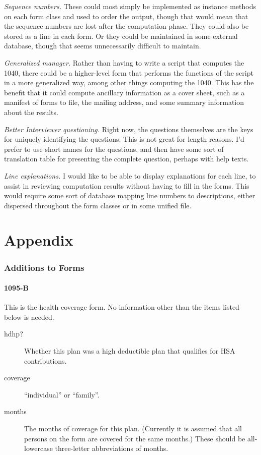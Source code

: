 \documentclass[12pt]{article}
\begin{document}
\emph{Sequence numbers.} These could most simply be implemented as instance
methods on each form class and used to order the output, though that would mean
that the sequence numbers are lost after the computation phase. They could also
be stored as a line in each form. Or they could be maintained in some external
database, though that seems unnecessarily difficult to maintain.

\emph{Generalized manager.} Rather than having to write a script that computes
the 1040, there could be a higher-level form that performs the functions of the
script in a more generalized way, among other things computing the 1040. This
has the benefit that it could compute ancillary information as a cover sheet,
such as a manifest of forms to file, the mailing address, and some summary
information about the results.

\emph{Better Interviewer questioning.} Right now, the questions themselves are
the keys for uniquely identifying the questions. This is not great for length
reasons. I'd prefer to use short names for the questions, and then have some
sort of translation table for presenting the complete question, perhaps with
help texts.

\emph{Line explanations.} I would like to be able to display explanations for
each line, to assist in reviewing computation results without having to fill in
the forms. This would require some sort of database mapping line numbers to
descriptions, either dispersed throughout the form classes or in some unified
file.




\appendix

\part*{Appendix}


\section{Additions to Forms}

\subsection{1095-B}

This is the health coverage form. No information other than the items listed
below is needed.

\begin{description}
\item[hdhp?] Whether this plan was a high deductible plan that qualifies for HSA
contributions.
\item[coverage] ``individual'' or ``family''.
\item[months] The months of coverage for this plan. (Currently it is assumed
that all persons on the form are covered for the same months.) These should be
all-lowercase three-letter abbreviations of months.
\end{description}
\end{document}
